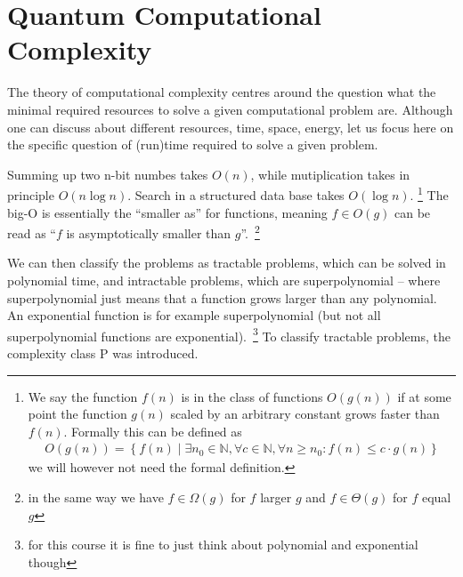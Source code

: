 \section{Quantum Computational Complexity}\label{chap:complexity}
The theory of computational complexity centres around the question what the minimal required resources to solve a given computational problem are. Although one can discuss about different resources, time, space, energy, let us focus here on the specific question of (run)time required to solve a given problem.

Summing up two n-bit numbes takes $O(n)$, while mutiplication takes in principle $O(n \log n)$. Search in a structured data base takes $O(\log n)$.
\footnote{We say the function $f(n)$ is in the class of functions $O(g(n))$ if at some point the function $g(n)$ scaled by an arbitrary constant grows faster than $f(n)$. Formally this can be defined as
\begin{align*}
    O(g(n)) = \left\{f(n) \;|\; \exists n_0\in\mathbb{N}, \forall c\in\mathbb{N}, \forall n\geq n_0: f(n)\leq c\cdot g(n)\right\}
\end{align*}
we will however not need the formal definition. }
The big-O is essentially the ``smaller as'' for functions, meaning $f\in O(g)$ can be read as ``$f$ is asymptotically smaller than $g$''.~\footnote{in the same way we have $f\in \Omega(g)$ for $f$ larger $g$ and $f\in\Theta(g)$ for $f$ equal $g$} 

We can then classify the problems as tractable problems, which can be solved in polynomial time, and intractable problems, which are superpolynomial -- where superpolynomial just means that a function grows larger than any polynomial. An exponential function is for example superpolynomial (but not all superpolynomial functions are exponential).~\footnote{for this course it is fine to just think about polynomial and exponential though}
To classify tractable problems, the complexity class $\mathrm{P}$ was introduced. 

